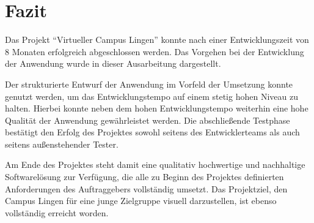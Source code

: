 \section{Fazit}
\label{sec:Fazit}

Das Projekt "`Virtueller Campus Lingen"' konnte nach einer Entwicklungszeit von
8 Monaten erfolgreich abgeschlossen werden. Das Vorgehen bei der Entwicklung der
Anwendung wurde in dieser Ausarbeitung dargestellt.

Der strukturierte Entwurf der Anwendung im Vorfeld der Umsetzung konnte genutzt
werden, um das Entwicklungstempo auf einem stetig hohen Niveau zu halten.
Hierbei konnte neben dem hohen Entwicklungstempo weiterhin eine hohe Qualität
der Anwendung gewährleistet werden. Die abschließende Testphase bestätigt den
Erfolg des Projektes sowohl seitens des Entwicklerteams als auch seitens
außenstehender Tester.

Am Ende des Projektes steht damit eine qualitativ hochwertige und nachhaltige
Softwarelösung zur Verfügung, die alle zu Beginn des Projektes definierten
Anforderungen des Auftraggebers vollständig umsetzt. Das Projektziel, den Campus
Lingen für eine junge Zielgruppe visuell darzustellen, ist ebenso vollständig
erreicht worden.

